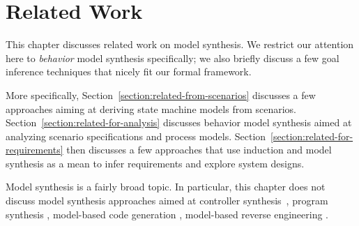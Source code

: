 \chapter{Related Work\label{chapter:discussion}}

This chapter discusses related work on model synthesis. We restrict our attention here to \emph{behavior} model synthesis specifically; we also briefly discuss a few goal inference techniques that nicely fit our formal framework. 

More specifically, Section~\ref{section:related-from-scenarios} discusses a few approaches aiming at deriving state machine models from scenarios. Section~\ref{section:related-for-analysis} discusses behavior model synthesis aimed at analyzing scenario specifications and process models. Section~\ref{section:related-for-requirements} then discusses a few approaches that use induction and model synthesis as a mean to infer requirements and explore system designs.

Model synthesis is a fairly broad topic. In particular, this chapter does not discuss model synthesis approaches aimed at controller synthesis~\cite{Clarke:1981, Pnueli:1989, Asarin:1995}, program synthesis \cite{Manna:1971, Balzer:1985, Wasowski:2003}, model-based code generation \cite{Kohler:2000, Wasowski:2003}, model-based reverse engineering \cite{Briand:2003, Yu:2005}.





